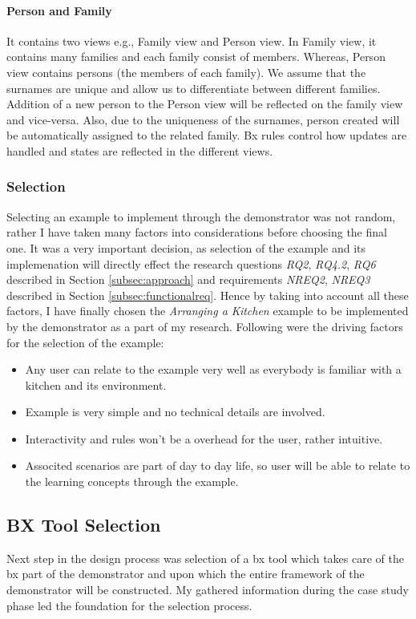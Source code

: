 \paragraph{Person and Family}
It contains two views e.g., Family view and Person view. In Family view, it contains many families and each family consist of members. Whereas, Person view contains persons (the members of each family). We assume that the surnames are unique and allow us to differentiate between different families. Addition of a new person to the Person view will be reflected on the family view and vice-versa. Also, due to the uniqueness of the surnames, person created will be automatically assigned to the related family. Bx rules control how updates are handled and states are reflected in the different views.

\subsubsection{Selection}\label{subsubsec:exampleselection}
Selecting an example to implement through the demonstrator was not random, rather I have taken many factors into considerations before choosing the final one. It was a very important decision, as selection of the example and its implemenation will directly effect the research questions \textit{RQ2}, \textit{RQ4.2}, \textit{RQ6} described in Section \ref{subsec:approach} and requirements \textit{NREQ2}, \textit{NREQ3} described in Section \ref{subsec:functionalreq}.
\newline\newline Hence by taking into account all these factors, I have finally chosen the \textit{Arranging a Kitchen} example to be implemented by the demonstrator as a part of my research. Following were the driving factors for the selection of the example:
\begin{itemize}
	\item {Any user can relate to the example very well as everybody is familiar with a kitchen and its environment.}
	\item {Example is very simple and no technical details are involved.}
	\item {Interactivity and rules won't be a overhead for the user, rather intuitive.}
	\item {Associted scenarios are part of day to day life, so user will be able to relate to the learning concepts through the example.}
\end{itemize}

\subsection{BX Tool Selection}\label{subsec:bxtoolselection}
Next step in the design process was selection of a bx tool which takes care of the bx part of the demonstrator and upon which the entire framework of the demonstrator will be constructed. My gathered information during the case study phase led the foundation for the selection process.
